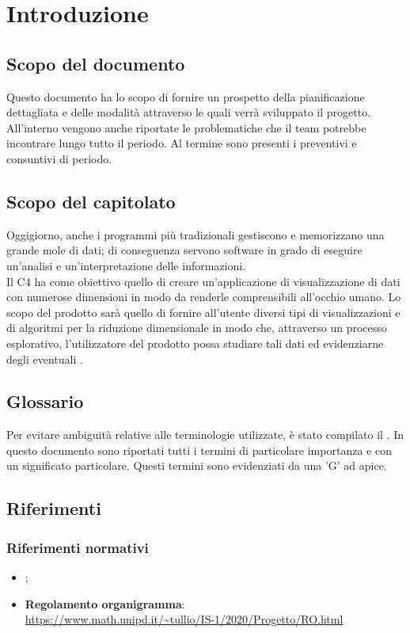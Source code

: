 \section{Introduzione}

\subsection{Scopo del documento}
Questo documento ha lo scopo di fornire un prospetto della pianificazione dettagliata e delle modalità attraverso le quali verrà sviluppato il progetto. All'interno vengono anche riportate le problematiche che il team potrebbe incontrare lungo tutto il periodo. Al termine sono presenti i preventivi e consuntivi di periodo.

\subsection{Scopo del capitolato}
Oggigiorno, anche i programmi più tradizionali gestiscono e memorizzano una grande mole di dati; di conseguenza servono software in grado di eseguire un'analisi e un'interpretazione delle informazioni.\\
Il  C4 ha come obiettivo quello di creare un'applicazione di visualizzazione di dati con numerose dimensioni in modo da renderle comprensibili all'occhio umano.  Lo scopo del prodotto sarà quello di fornire all'utente diversi tipi di visualizzazioni e di algoritmi per la riduzione dimensionale in modo che, attraverso un processo esplorativo, l'utilizzatore del prodotto possa studiare tali dati ed evidenziarne degli eventuali . 

\subsection{Glossario}
Per evitare ambiguità relative alle terminologie utilizzate, è stato compilato il . In questo documento sono riportati tutti i termini di particolare importanza e con un significato particolare. Questi termini sono evidenziati da una 'G' ad apice.

\subsection{Riferimenti}
\subsubsection{Riferimenti normativi}
\begin{itemize}	
	\item \textbf{};
	
	\item \textbf{Regolamento organigramma}:\\
	\textcolor{blue}{\url{https://www.math.unipd.it/~tullio/IS-1/2020/Progetto/RO.html}}
\end{itemize}


